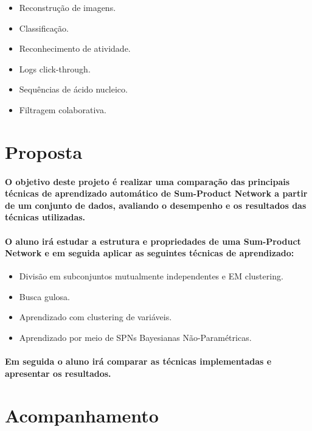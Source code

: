 \documentclass[a4paper,10pt]{article}
\theoremstyle{plain}
\begin{document}
\begin{itemize} \itemsep0pt
  \item Reconstrução de imagens.
  \item Classificação.
  \item Reconhecimento de atividade.
  \item Logs click-through.
  \item Sequências de ácido nucleico.
  \item Filtragem colaborativa.
\end{itemize}

\section{Proposta}

\paragraph{
  O objetivo deste projeto é realizar uma comparação das principais técnicas de aprendizado 
automático de Sum-Product Network a partir de um conjunto de dados, avaliando o desempenho 
e os resultados das técnicas utilizadas.
}

\paragraph{
  O aluno irá estudar a estrutura e propriedades de uma Sum-Product Network e em seguida
aplicar as seguintes técnicas de aprendizado:
}

\begin{itemize} \itemsep0pt
  \item Divisão em subconjuntos mutualmente independentes e EM clustering.\cite{gens-domingos}  
  \item Busca gulosa.\cite{greedy-search}
  \item Aprendizado com clustering de variáveis.\cite{clustering}
  \item Aprendizado por meio de SPNs Bayesianas Não-Paramétricas.\cite{non-parametric-bayesian}
\end{itemize}

\paragraph{
  Em seguida o aluno irá comparar as técnicas implementadas e apresentar os resultados.
}

\section{Acompanhamento}
\end{document}
